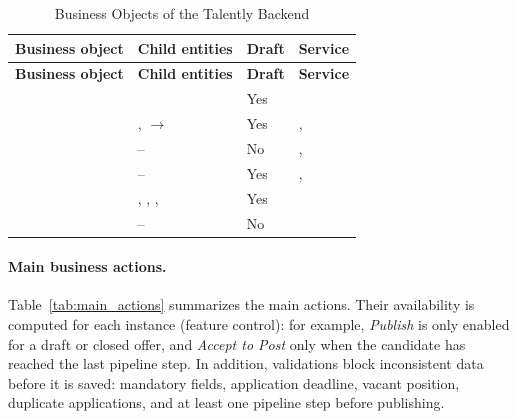 \begingroup
\linespread{1}\selectfont
\renewcommand{\arraystretch}{1.4}
\begin{longtable}{@{}F{3.6cm}F{7.9cm}C{1.1cm}F{4.6cm}@{}}
\caption{Business Objects of the Talently Backend}\label{tab:bo_catalogue}\\
\toprule
\textbf{Business object} & \textbf{Child entities} & \textbf{Draft} & \textbf{Service} \\
\midrule
\endfirsthead
\toprule
\textbf{Business object} & \textbf{Child entities} & \textbf{Draft} & \textbf{Service} \\
\midrule
\endhead
\bottomrule
\endlastfoot
{} &  & Yes &  \\
 & ,  $\rightarrow$  & Yes & ,  \\
 & -- & No & ,  \\
 & -- & Yes & ,  \\
 & , , ,  & Yes &  \\
 & -- & No &  \\
\end{longtable}
\endgroup

\paragraph*{Main business actions.} Table~\ref{tab:main_actions} summarizes the main actions. Their availability is computed for each instance (feature control): for example, \emph{Publish} is only enabled for a draft or closed offer, and \emph{Accept to Post} only when the candidate has reached the last pipeline step. In addition, validations block inconsistent data before it is saved: mandatory fields, application deadline, vacant position, duplicate applications, and at least one pipeline step before publishing.


